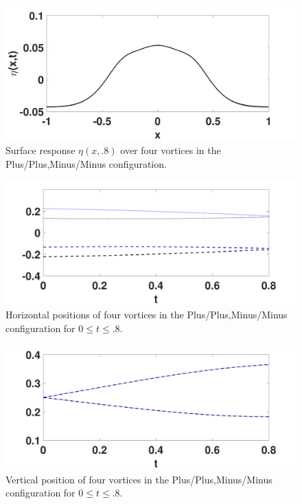 \documentclass[a4paper,11pt]{article}
\begin{document}
\begin{figure}[!h]
\centering
\includegraphics[width=.75\textwidth]{surf_resp_mu_pt2_F_pt2_tf_pt8_ppmm}
\caption{Surface response $\eta(x,.8)$ over four vortices in the Plus/Plus,Minus/Minus configuration.}
\label{fig:surfrepppmm}
\end{figure}
\begin{figure}[!h]
\centering
\includegraphics[width=.75\textwidth]{xtrack_mu_pt2_F_pt2_tf_pt8_ppmm}
\caption{Horizontal positions of four vortices in the Plus/Plus,Minus/Minus configuration for $0\leq t \leq .8$.}
\label{fig:xtrackppmm}
\end{figure}
\begin{figure}[!h]
\centering
\includegraphics[width=.75\textwidth]{ztrack_mu_pt2_F_pt2_tf_pt8_ppmm}
\caption{Vertical position of four vortices in the Plus/Plus,Minus/Minus configuration for $0\leq t \leq .8$.}
\end{figure}
\end{document}
